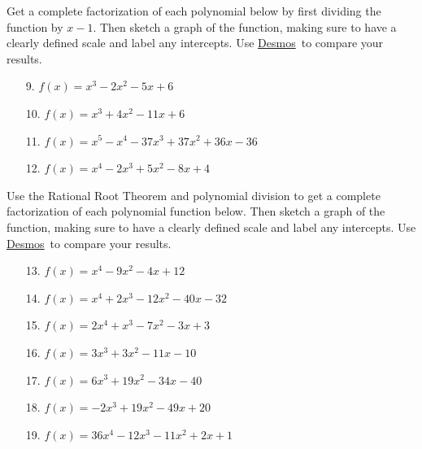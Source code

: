 \documentclass[12pt]{article}
\theoremstyle{definition}
\newcommand{\Desmos}{\href{https://www.desmos.com/}{Desmos}}
\begin{document}
Get a complete factorization of each polynomial below by first dividing the function by $x-1$.  Then sketch a graph of the function, making sure to have a clearly defined scale and label any intercepts.  Use \Desmos \ to compare your results.
\begin{enumerate}
	\item[9.] $f(x) = x^{3} - 2x^{2} - 5x + 6$
	\item[10.] $f(x) = x^{3} + 4x^{2} - 11x + 6$
	\item[11.] $f(x)=x^5-x^4-37x^3+37x^2+36x-36$
	\item[12.] $f(x) = x^{4} -2x^3+ 5x^{2} - 8x + 4$
\end{enumerate}
Use the Rational Root Theorem and polynomial division to get a complete factorization of each polynomial function below.  Then sketch a graph of the function, making sure to have a clearly defined scale and label any intercepts.  Use \Desmos \ to compare your results.
\begin{enumerate}
	\item[13.] $f(x) = x^{4} - 9x^{2} - 4x + 12$
	\item[14.] $f(x) = x^{4} + 2x^{3} - 12x^{2} - 40x - 32$
	\item[15.] $f(x) = 2x^4+x^3-7x^2-3x+3$
	\item[16.] $f(x) = 3x^{3} + 3x^{2} - 11x - 10$
	\item[17.] $f(x) = 6x^3+19x^2-34x-40$
	\item[18.] $f(x) = -2x^{3} + 19x^{2} - 49x + 20$
	\item[19.] $f(x) = 36x^{4} - 12x^{3} - 11x^{2} + 2x + 1$
\end{enumerate}
\newpage
\end{document}
